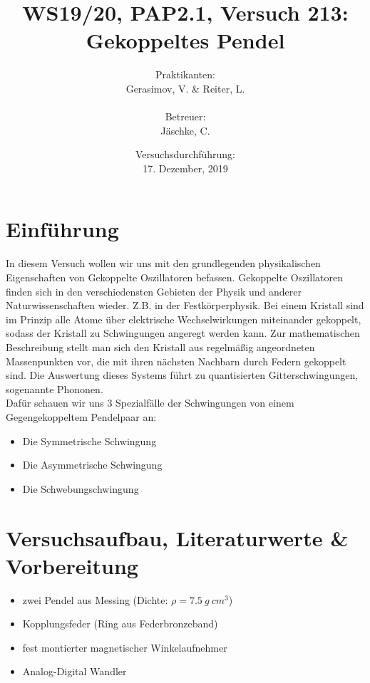 \documentclass[a4paper,10pt]{article}
\title{WS19/20, PAP2.1, Versuch 213:\\ Gekoppeltes Pendel}
\date{Versuchsdurchführung: \\17. Dezember, 2019}
\author{Praktikanten:\\Gerasimov, V. \& Reiter, L.\\\\ Betreuer:\\ Jäschke, C.}
\begin{document}
\maketitle

\newpage

\tableofcontents


\section[Einführung]{Einführung\fnrefb}\boldmath
In diesem Versuch wollen wir uns mit den grundlegenden physikalischen Eigenschaften von Gekoppelte Oszillatoren befassen. Gekoppelte Oszillatoren finden sich in den verschiedensten Gebieten der Physik und anderer Naturwissenschaften  wieder. Z.B. in  der Festkörperphysik. Bei einem Kristall sind im Prinzip alle Atome über elektrische Wechselwirkungen miteinander gekoppelt, sodass der Kristall zu Schwingungen angeregt werden kann. Zur mathematischen Beschreibung stellt man sich den Kristall aus regelmäßig angeordneten Massenpunkten vor, die mit ihren nächsten Nachbarn durch Federn gekoppelt sind. Die Auswertung dieses Systems führt zu quantisierten Gitterschwingungen, sogenannte Phononen.\\

Dafür schauen wir uns 3 Spezialfälle der Schwingungen von einem Gegengekoppeltem Pendelpaar an:
\begin{itemize}
\item Die Symmetrische Schwingung
\item Die Asymmetrische Schwingung
\item Die Schwebungschwingung
\end{itemize}

\section[Versuchsaufbau, Literaturwerte \& Vorbereitung]{Versuchsaufbau\fnrefb, Literaturwerte \& Vorbereitung}
\begin{itemize}
\item zwei Pendel aus Messing (Dichte: \(\rho=7.5\:g\:{cm}^{3}\))
\item Kopplungsfeder (Ring aus Federbronzeband)
\item fest montierter magnetischer Winkelaufnehmer
\item Analog-Digital Wandler
\end{itemize}
\end{document}
